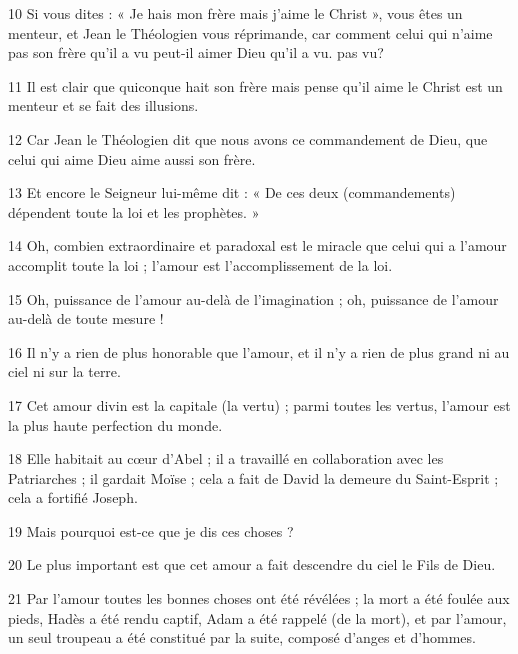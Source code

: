 \par 10 Si vous dites : « Je hais mon frère mais j'aime le Christ », vous êtes un menteur, et Jean le Théologien vous réprimande, car comment celui qui n'aime pas son frère qu'il a vu peut-il aimer Dieu qu'il a vu. pas vu?

\par 11 Il est clair que quiconque hait son frère mais pense qu'il aime le Christ est un menteur et se fait des illusions.

\par 12 Car Jean le Théologien dit que nous avons ce commandement de Dieu, que celui qui aime Dieu aime aussi son frère.

\par 13 Et encore le Seigneur lui-même dit : « De ces deux (commandements) dépendent toute la loi et les prophètes. »

\par 14 Oh, combien extraordinaire et paradoxal est le miracle que celui qui a l'amour accomplit toute la loi ; l'amour est l'accomplissement de la loi.

\par 15 Oh, puissance de l'amour au-delà de l'imagination ; oh, puissance de l'amour au-delà de toute mesure !

\par 16 Il n'y a rien de plus honorable que l'amour, et il n'y a rien de plus grand ni au ciel ni sur la terre.

\par 17 Cet amour divin est la capitale (la vertu) ; parmi toutes les vertus, l’amour est la plus haute perfection du monde.

\par 18 Elle habitait au cœur d'Abel ; il a travaillé en collaboration avec les Patriarches ; il gardait Moïse ; cela a fait de David la demeure du Saint-Esprit ; cela a fortifié Joseph.

\par 19 Mais pourquoi est-ce que je dis ces choses ?

\par 20 Le plus important est que cet amour a fait descendre du ciel le Fils de Dieu.

\par 21 Par l'amour toutes les bonnes choses ont été révélées ; la mort a été foulée aux pieds, Hadès a été rendu captif, Adam a été rappelé (de la mort), et par l'amour, un seul troupeau a été constitué par la suite, composé d'anges et d'hommes.

